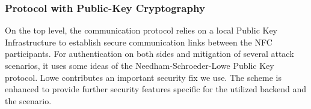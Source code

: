 
\subsubsection{Protocol with Public-Key Cryptography}\label{sec:alt:proto:pubkey}
On the top level, the communication protocol relies on a local Public Key Infrastructure to establish secure communication links between the NFC participants.
For authentication on both sides and mitigation of several attack scenarios, it uses some ideas of the Needham-Schroeder-Lowe Public Key protocol. Lowe contributes an important security fix we use.
The scheme is enhanced to provide further security features specific for the utilized backend and the scenario.

